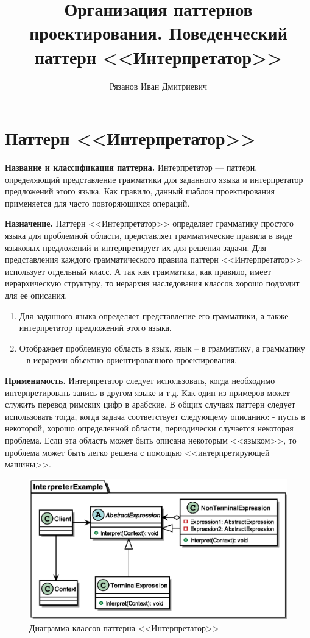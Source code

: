 \documentclass[PI,LAB]{HSEUniversity}
\title{Организация паттернов проектирования. Поведенческий паттерн <<Интерпретатор>>}
\author{Рязанов Иван Дмитриевич}
\begin{document}
\maketitle
\chapter{Паттерн <<Интерпретатор>>}
\textbf{Название и классификация паттерна.}
Интерпретатор — паттерн, определяющий представление грамматики для заданного языка и интерпретатор предложений этого языка. Как правило, данный шаблон проектирования применяется для часто повторяющихся операций.

\textbf{Назначение.}
Паттерн <<Интерпретатор>> определяет грамматику простого языка для проблемной области, представляет грамматические правила в виде языковых предложений и интерпретирует их для решения задачи. Для представления каждого грамматического правила паттерн <<Интерпретатор>> использует отдельный класс. А так как грамматика, как правило, имеет иерархическую структуру, то иерархия наследования классов хорошо подходит для ее описания.

\begin{enumerate}
	\item Для заданного языка определяет представление его грамматики, а также интерпретатор предложений этого языка.
	\item Отображает проблемную область в язык, язык – в грамматику, а грамматику – в иерархии объектно-ориентированного проектирования.
\end{enumerate}

\textbf{Применимость.}
Интерпретатор следует использовать, когда необходимо интерпретировать запись в другом языке и т.д. Как один из примеров может служить перевод римских цифр в арабские. В общих случаях паттерн следует использовать тогда, когда задача соответствует следующему описанию:
- пусть в некоторой, хорошо определенной области, периодически случается некоторая проблема. Если эта область может быть описана некоторым <<языком>>, то проблема может быть легко решена с помощью <<интерпретирующей машины>>.

\clearpage

\begin{figure}[p]
  \centering
  \includegraphics[scale=0.7]{Interpreter_CD.eps}
  \caption{Диаграмма классов паттерна <<Интерпретатор>>}
\end{figure}
\end{document}
